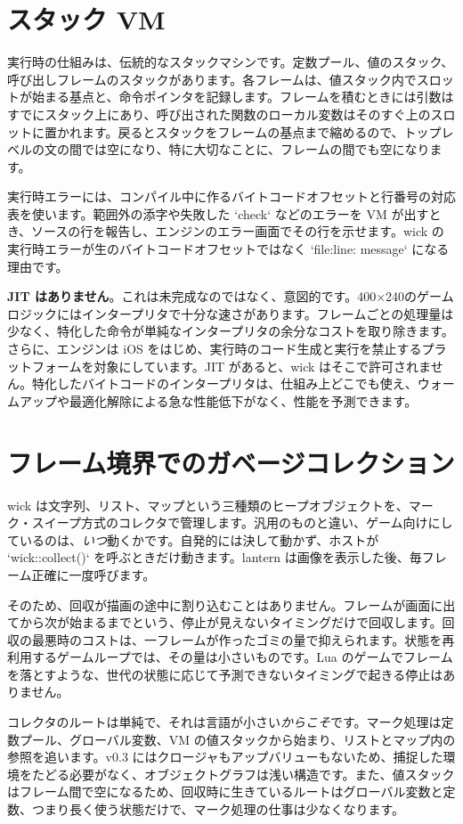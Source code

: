 \section{スタック VM}

実行時の仕組みは、伝統的なスタックマシンです。定数プール、値のスタック、呼び出しフレームのスタックがあります。各フレームは、値スタック内でスロットが始まる基点と、命令ポインタを記録します。フレームを積むときには引数はすでにスタック上にあり、呼び出された関数のローカル変数はそのすぐ上のスロットに置かれます。戻るとスタックをフレームの基点まで縮めるので、トップレベルの文の間では空になり、特に大切なことに、フレームの間でも空になります。

実行時エラーには、コンパイル中に作るバイトコードオフセットと行番号の対応表を使います。範囲外の添字や失敗した `check` などのエラーを VM が出すとき、ソースの行を報告し、エンジンのエラー画面でその行を示せます。wick の実行時エラーが生のバイトコードオフセットではなく `file:line: message` になる理由です。

\textbf{JIT はありません}。これは未完成なのではなく、意図的です。400×240のゲームロジックにはインタープリタで十分な速さがあります。フレームごとの処理量は少なく、特化した命令が単純なインタープリタの余分なコストを取り除きます。さらに、エンジンは iOS をはじめ、実行時のコード生成と実行を禁止するプラットフォームを対象にしています。JIT があると、wick はそこで許可されません。特化したバイトコードのインタープリタは、仕組み上どこでも使え、ウォームアップや最適化解除による急な性能低下がなく、性能を予測できます。

\section{フレーム境界でのガベージコレクション}

wick は文字列、リスト、マップという三種類のヒープオブジェクトを、マーク・スイープ方式のコレクタで管理します。汎用のものと違い、ゲーム向けにしているのは、\emph{いつ}動くかです。自発的には決して動かず、ホストが `wick::collect()` を呼ぶときだけ動きます。lantern は画像を表示した後、毎フレーム正確に一度呼びます。

そのため、回収が描画の途中に割り込むことはありません。フレームが画面に出てから次が始まるまでという、停止が見えないタイミングだけで回収します。回収の最悪時のコストは、一フレームが作ったゴミの量で抑えられます。状態を再利用するゲームループでは、その量は小さいものです。Lua のゲームでフレームを落とすような、世代の状態に応じて予測できないタイミングで起きる停止はありません。

コレクタのルートは単純で、それは言語が小さい\emph{からこそ}です。マーク処理は定数プール、グローバル変数、VM の値スタックから始まり、リストとマップ内の参照を追います。v0.3 にはクロージャもアップバリューもないため、捕捉した環境をたどる必要がなく、オブジェクトグラフは浅い構造です。また、値スタックはフレーム間で空になるため、回収時に生きているルートはグローバル変数と定数、つまり長く使う状態だけで、マーク処理の仕事は少なくなります。

